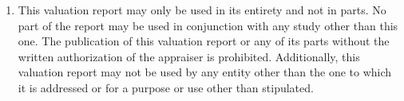 \begin{enumerate}[\indent a)]
\item This valuation report may only be used in its entirety and not in parts. No part of the report may be used in conjunction with any study other than this one. The publication of this valuation report or any of its parts without the written authorization of the appraiser is prohibited. Additionally, this valuation report may not be used by any entity other than the one to which it is addressed or for a purpose or use other than stipulated.

\end{enumerate}









